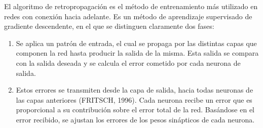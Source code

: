 El algoritmo de retropropagación es el método de entrenamiento más utilizado en redes con conexión hacia adelante. Es un método de aprendizaje supervisado de gradiente descendente, en el que se distinguen claramente dos fases:
\begin{enumerate}
	\item Se aplica un patrón de entrada, el cual se propaga por las distintas capas que componen la red hasta producir la salida de la misma. Esta salida se compara con la salida deseada y se calcula el error cometido por cada neurona de salida.

	\item Estos errores se transmiten desde la capa de salida, hacia todas neuronas de las capas anteriores {\Huge (FRITSCH, 1996)}. Cada neurona recibe un error que es proporcional a su contribución sobre el error total de la red. Basándose en el error recibido, se ajustan los errores de los pesos sinápticos de cada neurona.
\end{enumerate}








